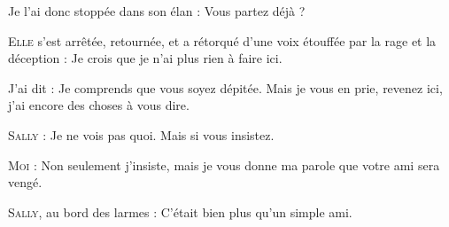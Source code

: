 \begin{dialogue}

Je l’ai donc stoppée dans son élan : Vous partez déjà ?

\textsc{Elle} s’est arrêtée, retournée, et a rétorqué d’une voix étouffée par la rage et la déception : Je crois que je n’ai plus rien à faire ici.

J’ai dit : Je comprends que vous soyez dépitée. Mais je vous en prie, revenez ici, j’ai encore des choses à vous dire.

\textsc{Sally} : Je ne vois pas quoi. Mais si vous insistez.

\textsc{Moi} : Non seulement j’insiste, mais je vous donne ma parole que votre ami sera vengé.

\textsc{Sally}, au bord des larmes : C’était bien plus qu’un simple ami.


\end{dialogue}
